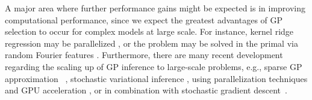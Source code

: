 A major area where further performance gains might be expected is in
improving computational performance, since we expect the greatest
advantages of GP selection to occur for complex models at large scale. For instance,
 kernel ridge regression may be parallelized \citep{zhang14divide},
or the problem may be solved in the primal via random Fourier features \citep{LeSarSmo13}.
Furthermore, there are many recent development regarding the scaling up of GP inference to large-scale problems, e.g., sparse GP approximation
~\citep{sparseGP}, stochastic variational inference \citep{HensmanEtAl2013,Hensman2012}, using parallelization techniques and GPU acceleration \citep{butt}, or in combination with stochastic gradient descent~\cite{Bottou08thetradeoffs}. 

%
%

